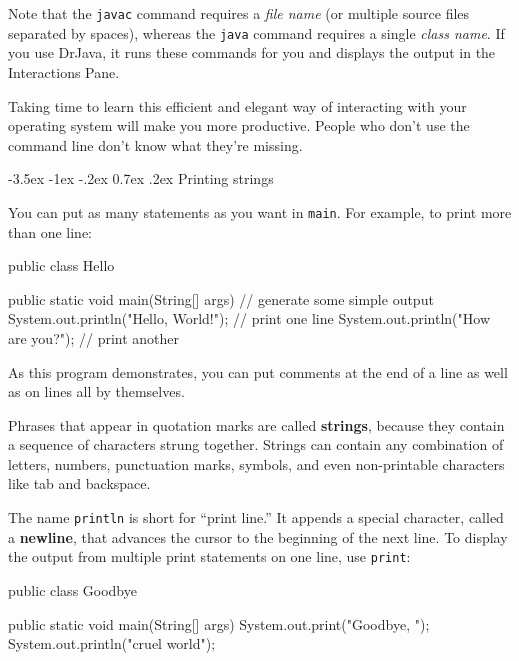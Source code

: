 \documentclass[12pt]{book}
\makeatletter
\theoremstyle{exercise}
\newcommand{\java}[1]{\verb"#1"}
\renewcommand{\section}{\@startsection {section}{1}{\z@}%
    {-3.5ex \@plus -1ex \@minus -.2ex}%
    {0.7ex \@plus.2ex}%
    {\normalfont\Large\bfseries}}
\newcommand{\java}[1]{\lstinline{#1}} %
\makeatother
\begin{document}
Note that the {\tt javac} command requires a {\em file name} (or multiple source files separated by spaces), whereas the {\tt java} command requires a single {\em class name}.
If you use DrJava, it runs these commands for you and displays the output in the Interactions Pane.

Taking time to learn this efficient and elegant way of interacting with your operating system will make you more productive.
People who don't use the command line don't know what they're missing.



\section{Printing strings}

You can put as many statements as you want in \java{main}.
For example, to print more than one line:

\begin{code}
public class Hello {

    public static void main(String[] args) {
        // generate some simple output
        System.out.println("Hello, World!");  // print one line
        System.out.println("How are you?");   // print another
    }

}
\end{code}

As this program demonstrates, you can put comments at the end of a line as well as on lines all by themselves.


Phrases that appear in quotation marks are called {\bf strings}, because they contain a sequence of characters strung together.
Strings can contain any combination of letters, numbers, punctuation marks, symbols, and even non-printable characters like tab and backspace.


The name \java{println} is short for ``print line.''
It appends a special character, called a {\bf newline}, that advances the cursor to the beginning of the next line.
To display the output from multiple print statements on one line, use \java{print}:

\begin{code}
public class Goodbye {

    public static void main(String[] args) {
        System.out.print("Goodbye, ");
        System.out.println("cruel world");
    }

}
\end{code}
\end{document}

